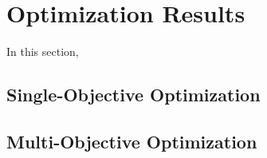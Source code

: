 \section{Optimization Results}
In this section, 

\subsection{Single-Objective Optimization}

\subsection{Multi-Objective Optimization}